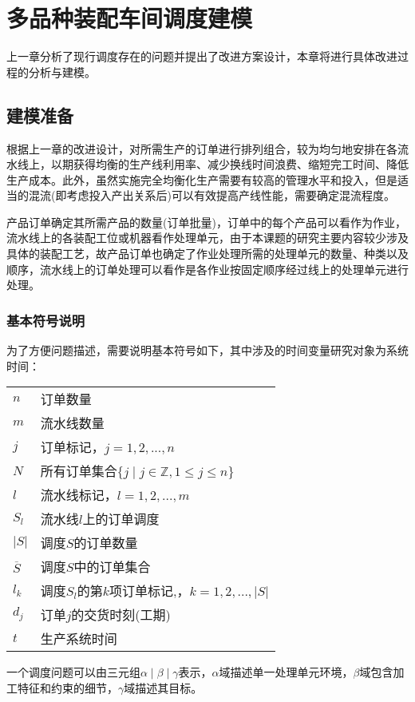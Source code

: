 \chapter{多品种装配车间调度建模}
上一章分析了现行调度存在的问题并提出了改进方案设计，本章将进行具体改进过程的分析与建模。

\section{建模准备}

根据上一章的改进设计，对所需生产的订单进行排列组合，较为均匀地安排在各流水线上，以期获得均衡的生产线利用率、减少换线时间浪费、缩短完工时间、降低生产成本。此外，虽然实施完全均衡化生产需要有较高的管理水平和投入，但是适当的混流(即考虑投入产出关系后)可以有效提高产线性能，需要确定混流程度。

产品订单确定其所需产品的数量(订单批量)，订单中的每个产品可以看作为作业，流水线上的各装配工位或机器看作处理单元，由于本课题的研究主要内容较少涉及具体的装配工艺，故产品订单也确定了作业处理所需的处理单元的数量、种类以及顺序，流水线上的订单处理可以看作是各作业按固定顺序经过线上的处理单元进行处理。

\subsection{基本符号说明}
为了方便问题描述，需要说明基本符号如下，其中涉及的时间变量研究对象为系统时间：\\[3pt]
\begin{supertabular}{ll}
$n$ & 订单数量\\
$m$ & 流水线数量\\
$j$ & 订单标记，$j = 1,2,...,n$\\
$N$ & 所有订单集合$\{ j\mid j \in \mathbb{Z}, 1\le j \le n  \}$\\
$l$ & 流水线标记，$l = 1,2,...,m$\\
$S_l$ & 流水线$l$上的订单调度\\
$|S|$ & 调度$S$的订单数量\\
$\overline S$ & 调度$S$中的订单集合\\
$l_k$ & 调度$S_l$的第$k$项订单标记,，$k = 1,2,...,|S|$\\
$d_j$ & 订单$j$的交货时刻(工期)\\
$t$ & 生产系统时间\\[3pt]
\end{supertabular}

一个调度问题可以由三元组$\alpha \mid \beta \mid \gamma$表示，$\alpha$域描述单一处理单元环境，$\beta$域包含加工特征和约束的细节，$\gamma$域描述其目标\cite{pinedo}。

